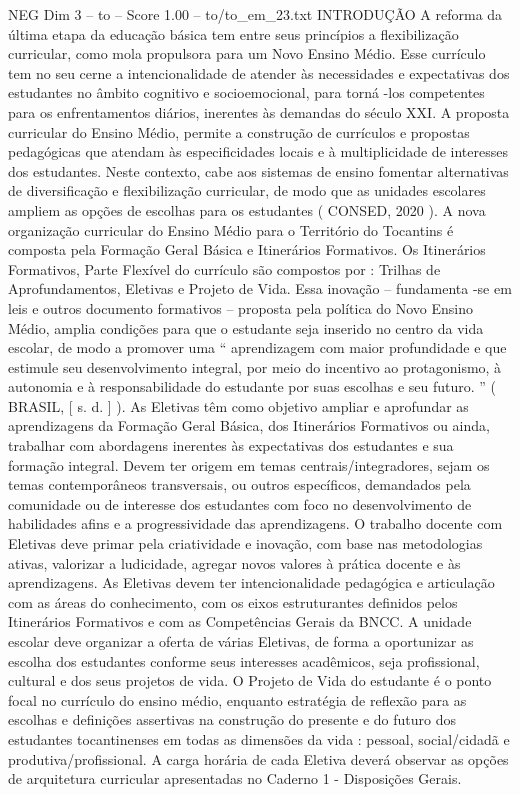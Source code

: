 \begin{textsample}{NEG Dim 3 – to – Score 1.00 – to/to\_em\_23.txt}  \label{ex:f3_neg_181}
INTRODUÇÃO A reforma da última etapa da educação básica tem entre seus princípios a flexibilização curricular, como mola propulsora para um Novo Ensino Médio.
Esse currículo tem no seu cerne a intencionalidade de atender às necessidades e expectativas dos estudantes no âmbito cognitivo e socioemocional, para torná -los competentes para os enfrentamentos diários, inerentes às demandas do século XXI.
A proposta curricular do Ensino Médio, permite a construção de currículos e propostas pedagógicas que atendam às especificidades locais e à multiplicidade de interesses dos estudantes.
Neste contexto, cabe aos sistemas de ensino fomentar alternativas de diversificação e flexibilização curricular, de modo que as unidades escolares ampliem as opções de escolhas para os estudantes ( CONSED, 2020 ).
A nova organização curricular do Ensino Médio para o Território do Tocantins é composta pela Formação Geral Básica e Itinerários Formativos.
Os Itinerários Formativos, Parte Flexível do currículo são compostos por : Trilhas de Aprofundamentos, Eletivas e Projeto de Vida.
Essa inovação – fundamenta -se em leis e outros documento formativos – proposta pela política do Novo Ensino Médio, amplia condições para que o estudante seja inserido no centro da vida escolar, de modo a promover uma “ aprendizagem com maior profundidade e que estimule seu desenvolvimento integral, por meio do incentivo ao protagonismo, à autonomia e à responsabilidade do estudante por suas escolhas e seu futuro. ” ( BRASIL, [ s. d. ] ).
As Eletivas têm como objetivo ampliar e aprofundar as aprendizagens da Formação Geral Básica, dos Itinerários Formativos ou ainda, trabalhar com abordagens inerentes às expectativas dos estudantes e sua formação integral.
Devem ter origem em temas centrais/integradores, sejam os temas contemporâneos transversais, ou outros específicos, demandados pela comunidade ou de interesse dos estudantes com foco no desenvolvimento de habilidades afins e a progressividade das aprendizagens.
O trabalho docente com Eletivas deve primar pela criatividade e inovação, com base nas metodologias ativas, valorizar a ludicidade, agregar novos valores à prática docente e às aprendizagens.
As Eletivas devem ter intencionalidade pedagógica e articulação com as áreas do conhecimento, com os eixos estruturantes definidos pelos Itinerários Formativos e com as Competências Gerais da BNCC.
A unidade escolar deve organizar a oferta de várias Eletivas, de forma a oportunizar as escolha dos estudantes conforme seus interesses acadêmicos, seja profissional, cultural e dos seus projetos de vida.
O Projeto de Vida do estudante é o ponto focal no currículo do ensino médio, enquanto estratégia de reflexão para as escolhas e definições assertivas na construção do presente e do futuro dos estudantes tocantinenses em todas as dimensões da vida : pessoal, social/cidadã e produtiva/profissional.
A carga horária de cada Eletiva deverá observar as opções de arquitetura curricular apresentadas no Caderno 1 - Disposições Gerais.

\end{textsample}
